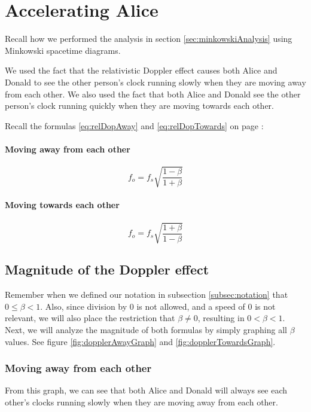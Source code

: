 \section{Accelerating Alice}\label{sec:acceleratingAlice}
	Recall how we performed the analysis in section \vref{sec:minkowskiAnalysis} using Minkowski spacetime diagrams.

	We used the fact that the relativistic Doppler effect causes both Alice and Donald to see the other person's clock running slowly when they are moving away from each other.
	We also used the fact that both Alice and Donald see the other person's clock running quickly when they are moving towards each other.

	Recall the formulas \eqref{eq:relDopAway} and \eqref{eq:relDopTowards} on page \pageref{eq:relDopAway}:
	\begin{samepagecols}{2}
		\paragraph{Moving away from each other}
		\begin{equation*}
			f_o = f_s \sqrt{\frac{1 - \beta}{1 + \beta}}
		\end{equation*}
		\paragraph{Moving towards each other}
		\begin{equation*}
			f_o = f_s \sqrt{\frac{1 + \beta}{1 - \beta}}
		\end{equation*}
	\end{samepagecols}
	\subsection{Magnitude of the Doppler effect}\label{subsec:dopMagnitude}
		Remember when we defined our notation in subsection \vref{subsec:notation} that $0 \leq \beta < 1$. Also, since division by 0 is not allowed, and a speed of 0 is not relevant, we will also place the restriction that $\beta \neq 0$, resulting in $0 < \beta < 1$.
		Next, we will analyze the magnitude of both formulas by simply graphing all $\beta$ values.
		See figure \ref{fig:dopplerAwayGraph} and \vref{fig:dopplerTowardsGraph}.
		\newpage
		\subsubsection{Moving away from each other}
			
			From this graph, we can see that both Alice and Donald will always see each other's clocks running slowly when they are moving away from each other.

